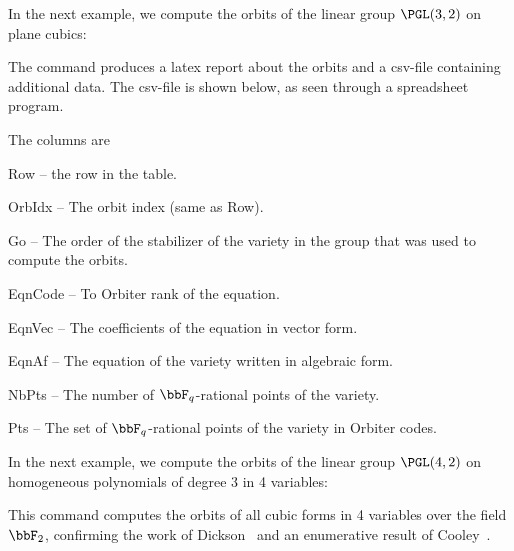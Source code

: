 


\bigskip


In the next example, we 
compute the orbits of 
the linear group $\PGL(3,2)$ on plane cubics: 


The command produces a latex report about the orbits 
and a csv-file containing additional data. 
The csv-file is shown below, 
as seen through a spreadsheet program.




The columns are 
\begin{trivlist}
\item
Row -- the row in the table.
\item
OrbIdx -- The orbit index (same as Row).
\item
Go -- The order of the stabilizer of the variety in the group that was used to compute the orbits.
\item
EqnCode -- To Orbiter rank of the equation. 
\item
EqnVec -- The coefficients of the equation in vector form.
\item
EqnAf -- The equation of the variety written in algebraic form. 
\item
NbPts -- The number of $\bbF_q$-rational points of the variety.
\item
Pts -- The set of $\bbF_q$-rational points of the variety in Orbiter codes.
\end{trivlist}


\bigskip


In the next example, we 
compute the orbits of 
the linear group $\PGL(4,2)$ 
on homogeneous polynomials of degree 3 in 4 variables: 


This command computes the orbits of 
all cubic forms in 4 variables over the field $\bbF_2$, 
confirming the work of Dickson~\cite{Dickson15} 
and an enumerative result of Cooley~\cite{Cooley14}.


\bigskip




